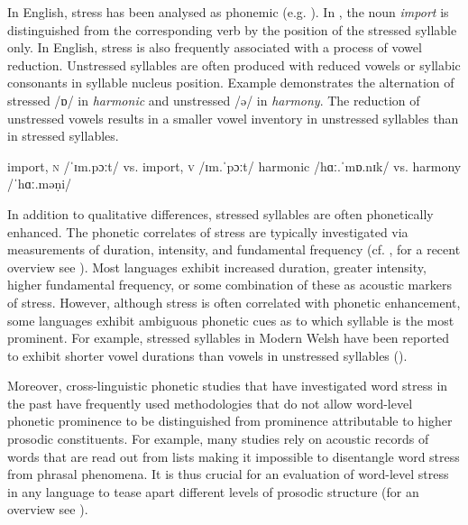In English, stress has been analysed as phonemic (e.g. \citealt{HalleVergnaud1987,Hayes1995}). In , the noun \textit{import} is distinguished from the corresponding verb by the position of the stressed syllable only. In English, stress is also frequently associated with a process of vowel reduction. Unstressed syllables are often produced with reduced vowels or syllabic consonants in syllable nucleus position. Example  demonstrates the alternation of stressed /ɒ/ in \textit{harmonic} and unstressed /ə/ in \textit{harmony}. The reduction of unstressed vowels results in a smaller vowel inventory in unstressed syllables than in stressed syllables.

\begin{exe}
\ex\label{ex:4:2} import, \textsc{n} /ˈɪm.pɔːt/ vs. import, \textsc{v} /ɪm.ˈpɔːt/
\ex\label{ex:4:3} harmonic /hɑː.ˈmɒ.nɪk/ vs. harmony /ˈhɑː.məṇi/
\end{exe}

In addition to qualitative differences, stressed syllables are often phonetically enhanced. The phonetic correlates of stress are typically investigated via measurements of duration, intensity, and fundamental frequency (cf. \citealt{Fry1955,Fry1958}, for a recent overview see \citealt{Gordon2014,GordonRoettger.underreview}). Most languages exhibit increased duration, greater intensity, higher fundamental frequency, or some combination of these as acoustic markers of stress. However, although stress is often correlated with phonetic enhancement, some languages exhibit ambiguous phonetic cues as to which syllable is the most prominent. For example, stressed syllables in Modern Welsh have been reported to exhibit shorter vowel durations than vowels in unstressed syllables (\citealt{Williams1999}).

Moreover, cross-linguistic phonetic studies that have investigated word stress in the past have frequently used methodologies that do not allow word-level phonetic prominence to be distinguished from prominence attributable to higher prosodic constituents. For example, many studies rely on acoustic records of words that are read out from lists making it impossible to disentangle word stress from phrasal phenomena. It is thus crucial for an evaluation of word-level stress in any language to tease apart different levels of prosodic structure (for an overview see \citealt{RoettgerGordon.underreview}).


